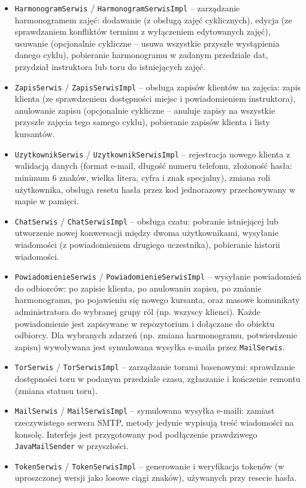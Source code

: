 \documentclass[a4paper,12pt]{article}
\begin{document}
\begin{itemize}
    \item \texttt{HarmonogramSerwis} / \texttt{HarmonogramSerwisImpl} -- zarządzanie harmonogramem zajęć: dodawanie (z obsługą zajęć cyklicznych), edycja (ze sprawdzaniem konfliktów terminu z wyłączeniem edytowanych zajęć), usuwanie (opcjonalnie cykliczne -- usuwa wszystkie przyszłe wystąpienia danego cyklu), pobieranie harmonogramu w zadanym przedziale dat, przydział instruktora lub toru do istniejących zajęć.

    \item \texttt{ZapisSerwis} / \texttt{ZapisSerwisImpl} -- obsługa zapisów klientów na zajęcia: zapis klienta (ze sprawdzeniem dostępności miejsc i powiadomieniem instruktora), anulowanie zapisu (opcjonalnie cykliczne -- anuluje zapisy na wszystkie przyszłe zajęcia tego samego cyklu), pobieranie zapisów klienta i listy kursantów.

    \item \texttt{UzytkownikSerwis} / \texttt{UzytkownikSerwisImpl} -- rejestracja nowego klienta z walidacją danych (format e-mail, długość numeru telefonu, złożoność hasła: minimum 6 znaków, wielka litera, cyfra i znak specjalny), zmiana roli użytkownika, obsługa resetu hasła przez kod jednorazowy przechowywany w mapie w pamięci.

    \item \texttt{ChatSerwis} / \texttt{ChatSerwisImpl} -- obsługa czatu: pobranie istniejącej lub utworzenie nowej konwersacji między dwoma użytkownikami, wysyłanie wiadomości (z powiadomieniem drugiego uczestnika), pobieranie historii wiadomości.

    \item \texttt{PowiadomienieSerwis} / \texttt{PowiadomienieSerwisImpl} -- wysyłanie powiadomień do odbiorców: po zapisie klienta, po anulowaniu zapisu, po zmianie harmonogramu, po pojawieniu się nowego kursanta, oraz masowe komunikaty administratora do wybranej grupy ról (np. wszyscy klienci). Każde powiadomienie jest zapisywane w repozytorium i dołączane do obiektu odbiorcy. Dla wybranych zdarzeń (np. zmiana harmonogramu, potwierdzenie zapisu) wywoływana jest symulowana wysyłka e-maila przez \texttt{MailSerwis}.

    \item \texttt{TorSerwis} / \texttt{TorSerwisImpl} -- zarządzanie torami basenowymi: sprawdzanie dostępności toru w podanym przedziale czasu, zgłaszanie i kończenie remontu (zmiana statusu toru).

    \item \texttt{MailSerwis} / \texttt{MailSerwisImpl} -- symulowana wysyłka e-maili: zamiast rzeczywistego serwera SMTP, metody jedynie wypisują treść wiadomości na konsolę. Interfejs jest przygotowany pod podłączenie prawdziwego \texttt{JavaMailSender} w przyszłości.

    \item \texttt{TokenSerwis} / \texttt{TokenSerwisImpl} -- generowanie i weryfikacja tokenów (w uproszczonej wersji jako losowe ciągi znaków), używanych przy resecie hasła.
\end{itemize}
\end{document}
